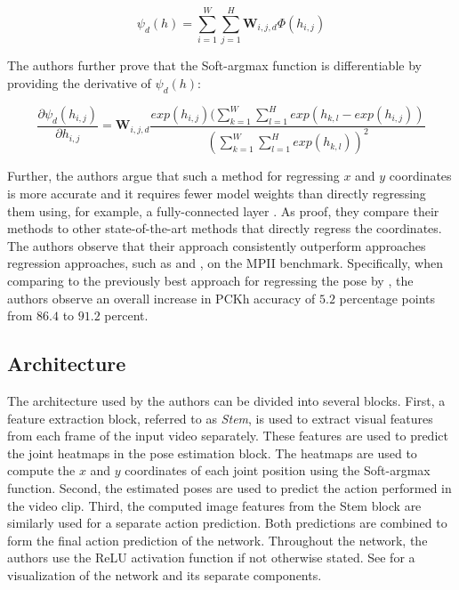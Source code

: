 \begin{equation}
    \label{eq:softargmax_conv}
    \psi_d(h) = \sum_{i=1}^W \sum_{j=1}^H \bm{W}_{i,j,d} \Phi(h_{i,j})
\end{equation}

The authors further prove that the Soft-argmax function is differentiable by providing the derivative of $\psi_d(h)$:

\begin{equation}
    \frac{\partial \psi_d(h_{i,j})}{\partial h_{i,j}} = \bm{W}_{i,j,d} \frac{ exp(h_{i,j}) (\sum_{k=1}^W \sum_{l=1}^H exp(h_{k,l} - exp(h_{i,j}) ) } { ( \sum_{k=1}^W \sum_{l=1}^H exp(h_{k,l}) )^2 }
\end{equation}

Further, the authors argue that such a method for regressing $x$ and $y$ coordinates is more accurate and it requires fewer model weights than directly regressing them using, for example, a fully-connected layer \cite{luvizon_human_2017}.
As proof, they compare their methods to other state-of-the-art methods that directly regress the coordinates.
The authors observe that their approach consistently outperform approaches regression approaches, such as \cite{carreira_human_2016} and \cite{sun_compositional_2017}, on the MPII benchmark.
Specifically, when comparing to the previously best approach for regressing the pose by \cite{sun_compositional_2017}, the authors observe an overall increase in PCKh accuracy of $5.2$ percentage points from $86.4$ to $91.2$ percent.

\subsection{Architecture}
\label{sec:deephar_architecture}

The architecture used by the authors can be divided into several blocks.
First, a feature extraction block, referred to as \textit{Stem}, is used to extract visual features from each frame of the input video separately.
These features are used to predict the joint heatmaps in the pose estimation block.
The heatmaps are used to compute the $x$ and $y$ coordinates of each joint position using the Soft-argmax function.
Second, the estimated poses are used to predict the action performed in the video clip.
Third, the computed image features from the Stem block are similarly used for a separate action prediction.
Both predictions are combined to form the final action prediction of the network.
Throughout the network, the authors use the ReLU activation function if not otherwise stated.
See  for a visualization of the network and its separate components.

